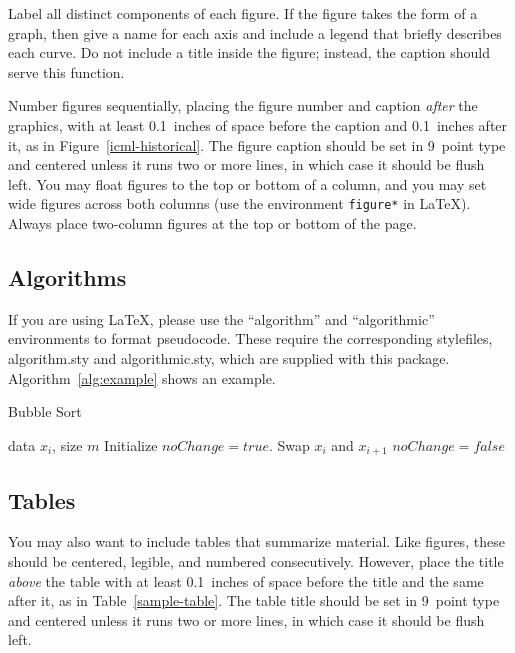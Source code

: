 \documentclass{article}
\begin{document}
Label all distinct components of each figure. If the figure takes the
form of a graph, then give a name for each axis and include a legend
that briefly describes each curve. Do not include a title inside the
figure; instead, the caption should serve this function.

Number figures sequentially, placing the figure number and caption
\emph{after} the graphics, with at least 0.1~inches of space before
the caption and 0.1~inches after it, as in
Figure~\ref{icml-historical}. The figure caption should be set in
9~point type and centered unless it runs two or more lines, in which
case it should be flush left. You may float figures to the top or
bottom of a column, and you may set wide figures across both columns
(use the environment \texttt{figure*} in \LaTeX). Always place
two-column figures at the top or bottom of the page.

\subsection{Algorithms}

If you are using \LaTeX, please use the ``algorithm'' and ``algorithmic''
environments to format pseudocode. These require
the corresponding stylefiles, algorithm.sty and
algorithmic.sty, which are supplied with this package.
Algorithm~\ref{alg:example} shows an example.

\begin{algorithm}[tb]
   \caption{Bubble Sort}
   \label{alg:example}
\begin{algorithmic}
    data $x_i$, size $m$
   \REPEAT
   \STATE Initialize $noChange = true$.
   \STATE Swap $x_i$ and $x_{i+1}$
   \STATE $noChange = false$
   \ENDIF
   \ENDFOR
\end{algorithmic}
\end{algorithm}

\subsection{Tables}

You may also want to include tables that summarize material. Like
figures, these should be centered, legible, and numbered consecutively.
However, place the title \emph{above} the table with at least
0.1~inches of space before the title and the same after it, as in
Table~\ref{sample-table}. The table title should be set in 9~point
type and centered unless it runs two or more lines, in which case it
should be flush left.
\end{document}
